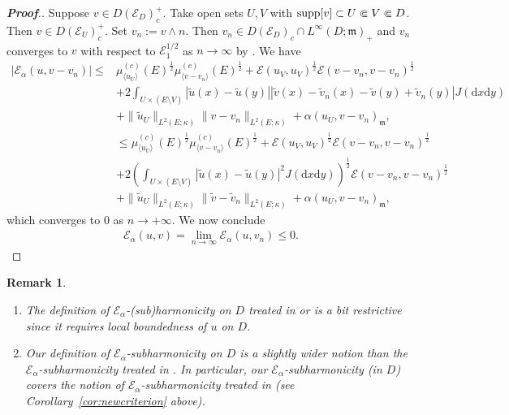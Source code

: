 \documentclass[12pt,a4paper]{article}
\newtheorem{remark}[thm]{Remark}
\renewcommand{\d}{\mathrm{d}}
\newcommand{\m}{\mathfrak{m} }
\newcommand{\1}{{\bf 1}}
\begin{document}
\begin{proof}[{\bf Proof}.]
Suppose $v\in D(\mathscr{E}_D)_c^+$. 
Take open sets $U,V$ with ${\rm supp}[v]\subset U\Subset V\Subset D$. 
Then $v\in D(\mathscr{E}_U)_c^+$. 
Set $v_n:=v\land n$. Then $v_n\in D(\mathscr{E}_D)_c\cap L^{\infty}(D;{\m})_+$ and $v_n$ converges to $v$ with respect to $\mathscr{E}_1^{1/2}$ as $n\to\infty$ by \cite[Theorem~1.4.2(iii)]{FOT}. 
We have 
\begin{align*}
|\mathscr{E}_{\alpha}(u,v-v_n)|\leq& 
\mu_{\langle u_U\rangle}^{(c)}(E)^{\frac12}\mu_{\langle v-v_n\rangle}^{(c)}(E)^{\frac12}+
\mathscr{E}(u_V,u_V)^{\frac12}\mathscr{E}({v}-v_n,{v}-v_n)^{\frac12}
\\
&+2\int_{U\times (E\setminus V)}|\tilde{u}(x)-\tilde{u}(y)|
|\tilde{v}(x)-\tilde{v}_n(x)-\tilde{v}(y)+\tilde{v}_n(y)|J({\d} x{\d} y)\\
&+\|\tilde{u}_U\|_{L^2(E;\kappa)}\|v-v_n\|_{L^2(E;\kappa)}
+\alpha(u_U,v-v_n)_{\m},\\
&\leq \mu_{\langle u_U\rangle}^{(c)}(E)^{\frac12}\mu_{\langle v-v_n\rangle}^{(c)}(E)^{\frac12}+
\mathscr{E}(u_V,u_V)^{\frac12}
\mathscr{E}(v-v_n,v-v_n)^{\frac12}
\\
&+2\left(\int_{U\times (E\setminus V)}|\tilde{u}(x)-\tilde{u}(y)|^2
J({\d} x{\d} y)\right)^{\frac12}\mathscr{E}(
v-v_n,v-v_n)^{\frac12}\\
&+\|\tilde{u}_U\|_{L^2(E;\kappa)}\|\tilde{v}-\tilde{v}_n\|_{L^2(E;\kappa)}
+\alpha(u_U,v-v_n)_{\m},
\end{align*}
which converges to $0$ as $n \to +\infty$. 
We now conclude 
\begin{align*}
\mathscr{E}_{\alpha}(u,v)=\lim_{n\to\infty}\mathscr{E}_{\alpha}(u,v_n)\leq0.
\end{align*} 
\end{proof}
\begin{remark}
{\rm 
\begin{enumerate}
\item[{\rm (1)}] The definition of $\mathscr{E}_{\alpha}$-(sub)harmonicity on $D$ treated in \cite[Definition~2.6]{Chen} or  \cite[Definition~2.6]{CK} is 
a bit restrictive since it requires local boundedness of $u$ on $D$.
\item[{\rm (2)}]
Our definition of $\mathscr{E}_{\alpha}$-subharmonicity on $D$ is a slightly wider notion than the 
$\mathscr{E}_{\alpha}$-subharmonicity treated in \cite{HuaKellerLenzSchmidt}. 
In particular, our $\mathscr{E}_{\alpha}$-subharmonicity (in $D$) covers the notion of 
$\mathscr{E}_{\alpha}$-subharmonicity treated in \cite[Definition~5.3]{MasamuneUemura2} (see Corollary~\ref{cor:newcriterion} above).
\end{enumerate}
}
\end{remark}
\end{document}
